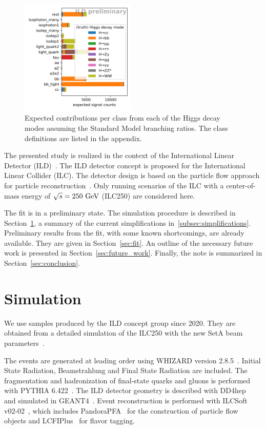 \documentclass[11pt, hidelinks, a4paper]{scrartcl}
\newcommand{\eV}{\text{e\kern-0.15ex V}\xspace}
\newcommand{\GeV}{\text{G\eV}\xspace}
\begin{document}
\begin{figure}[ht]
    \centering
    \includegraphics[width=0.49\textwidth, keepaspectratio]{intro_category_counts}
    \caption{
        Expected contributions per class from each of the Higgs decay modes
        assuming the Standard Model branching ratios.
        The class definitions are listed in the appendix.
    }\label{fig:box_counts}
\end{figure}

The presented study is realized in the context of the
International Linear Detector (ILD)~\cite{ILD_DBD,ILD_IDR}.
The ILD detector concept is proposed for the International Linear Collider (ILC).
The detector design is based on the particle flow approach
for particle reconstruction~\cite{ParticleFlow}.
Only running scenarios of the ILC
with a center-of-mass energy of $\sqrt{s}=250~\GeV$ (ILC250)
are considered here.

The fit is in a preliminary state.
The simulation procedure is described in Section~\ref{sec:simulation},
a summary of the
current simplifications in~\ref{subsec:simplifications}.
Preliminary results from the fit,
with some known shortcomings, are already available.
They are given in Section~\ref{sec:fit}.
An outline of the necessary future work is presented
in Section~\ref{sec:future_work}.
Finally, the note is summarized in Section~\ref{sec:conclusion}.

\section{Simulation}\label{sec:simulation}
We use samples produced by the ILD concept group since 2020.
They are obtained from a detailed simulation of the ILC250
with the new SetA beam parameters~\cite{ILC_Staging_2017}.

The events are generated at leading order using
WHIZARD version 2.8.5~\cite{whizard,omega}.
Initial State Radiation, Beamstrahlung and Final State Radiation are included.
The fragmentation and hadronization of final-state quarks and gluons
is performed with PYTHIA 6.422~\cite{pythia}.
The ILD detector geometry is described with DD4hep~\cite{DD4hep}
and simulated in GEANT4~\cite{GEANT4}.
Event reconstruction is performed with ILCSoft v02-02~\cite{ILCSoft},
which includes PandoraPFA~\cite{PandoraPFA} for
the construction of particle flow objects
and LCFIPlus~\cite{LCFIPlus} for flavor tagging.
\end{document}
